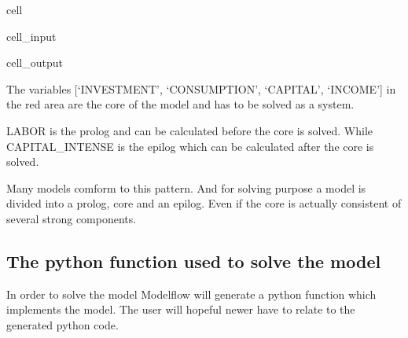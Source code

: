 \documentclass[letterpaper,10pt,english]{jupyterBook}
\begin{document}
\begin{sphinxuseclass}{cell}\begin{sphinxVerbatimInput}

\begin{sphinxuseclass}{cell_input}
\begin{sphinxVerbatim}[commandchars=\\\{\}]
\end{sphinxVerbatim}

\end{sphinxuseclass}\end{sphinxVerbatimInput}
\begin{sphinxVerbatimOutput}

\begin{sphinxuseclass}{cell_output}
\noindent{}

\end{sphinxuseclass}\end{sphinxVerbatimOutput}

\end{sphinxuseclass}
\sphinxAtStartPar
The variables  {[}‘INVESTMENT’, ‘CONSUMPTION’, ‘CAPITAL’, ‘INCOME’{]} in the red area are the core of the model and has to be solved as a system.

\sphinxAtStartPar
LABOR is the prolog and can be calculated before the core is solved. While CAPITAL\_INTENSE is the epilog which can be calculated after the core is solved.

\sphinxAtStartPar
Many models comform to this pattern. And for solving purpose a model is divided into a prolog, core and an epilog. Even if the core is actually consistent of several strong components.


\subsection{The python function used to solve the model}
\label{\detokenize{content/notebooks/intro/Example Solow:the-python-function-used-to-solve-the-model}}\label{\detokenize{content/notebooks/intro/Example Solow:solow-python-code}}
\sphinxAtStartPar
In order to solve the model Modelflow will generate a python function which implements the model. The user will hopeful  newer have to relate to the generated python code. 
\end{document}
